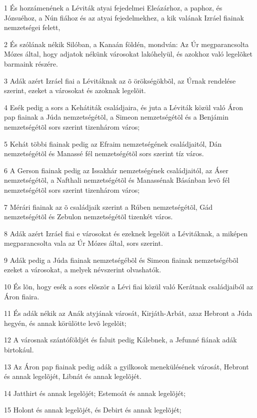 \par 1 És hozzámenének a Léviták atyai fejedelmei Eleázárhoz, a paphoz, és Józsuéhoz, a Nún fiához és az atyai fejedelmekhez, a kik valának Izráel fiainak nemzetségei felett,
\par 2 És szólának nékik Silóban, a Kanaán földén, mondván: Az Úr megparancsolta Mózes által, hogy adjatok nékünk városokat lakóhelyül, és azokhoz való legelõket barmaink részére.
\par 3 Adák azért Izráel fiai a Lévitáknak az õ örökségökbõl, az Úrnak rendelése szerint, ezeket a városokat és azoknak legelõit.
\par 4 Esék pedig a sors a Kehátiták családjaira, és juta a Léviták közül való Áron pap fiainak a Júda nemzetségétõl, a Simeon nemzetségétõl és a Benjámin nemzetségétõl sors szerint tizenhárom város;
\par 5 Kehát többi fiainak pedig az Efraim nemzetségének családjaitól, Dán nemzetségétõl és Manassé fél nemzetségétõl sors szerint tíz város.
\par 6 A Gerson fiainak pedig az Issakhár nemzetségének családjaitól, az Áser nemzetségétõl, a Nafthali nemzetségétõl és Manassénak Básánban levõ fél nemzetségétõl sors szerint tizenhárom város;
\par 7 Mérári fiainak az õ családjaik szerint a Rúben nemzetségétõl, Gád nemzetségétõl és Zebulon nemzetségétõl tizenkét város.
\par 8 Adák azért Izráel fiai e városokat és ezeknek legelõit a Lévitáknak, a miképen megparancsolta vala az Úr Mózes által, sors szerint.
\par 9 Adák pedig a Júda fiainak nemzetségébõl és Simeon fiainak nemzetségébõl ezeket a városokat, a melyek névszerint olvashatók.
\par 10 És lõn, hogy esék a sors elõször a Lévi fiai közül való Kerátnak családjaiból az Áron fiaira.
\par 11 És adák nékik az Anák atyjának városát, Kirjáth-Arbát, azaz  Hebront a Júda hegyén, és annak körülötte levõ legelõit;
\par 12 A városnak szántóföldjét és faluit pedig Kálebnek, a Jefunné fiának adák birtokául.
\par 13 Az Áron pap fiainak pedig adák a gyilkosok menekülésének városát, Hebront és annak legelõjét, Libnát és annak legelõjét.
\par 14 Jatthirt és annak legelõjét; Estemoát és annak legelõjét;
\par 15 Holont és annak legelõjét, és Debirt és annak legelõjét;
